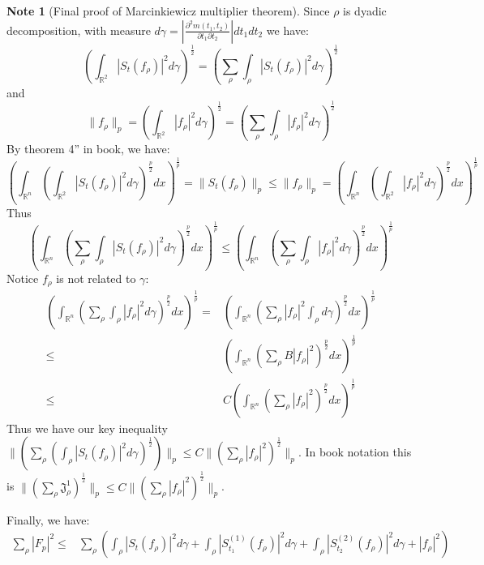 \documentclass{report}
\theoremstyle{definition}
\newtheorem{note}{Note}
\theoremstyle{definition}
\theoremstyle{plain}
\numberwithin{theorem}{section}
\numberwithin{remark}{section}
\numberwithin{equation}{section}
\newcommand{\norm}[1]{\lVert#1\rVert}
\newcommand{\abs}[1]{\left\lvert#1\right\rvert}
\begin{document}
\begin{note}[Final proof of Marcinkiewicz multiplier theorem]
    Since $\rho$ is dyadic decomposition, with measure $d\gamma=\abs{\frac{\partial^2 m(t_1,t_2)}{\partial t_1\partial t_2}}dt_1dt_2$ we have:
\begin{equation*}
    (\int_{\mathbb{R}^2}\abs{S_t(f_\rho)}^2d\gamma)^\frac{1}{2}=(\sum_\rho\int_{\rho}\abs{S_t(f_\rho)}^2d\gamma)^\frac{1}{2}
\end{equation*}
and
\begin{equation*}
    \norm{f_\rho}_p=(\int_{\mathbb{R}^2}\abs{f_\rho}^2d\gamma)^\frac{1}{2}=(\sum_\rho\int_{\rho}\abs{f_\rho}^2d\gamma)^\frac{1}{2}
\end{equation*}
By theorem 4'' in book, we have:
\begin{equation*}
    (\int_{\mathbb{R}^n}(\int_{\mathbb{R}^2}\abs{S_t(f_\rho)}^2d\gamma)^\frac{p}{2}dx)^\frac{1}{p}=\norm{S_t(f_\rho)}_p\leq\norm{f_\rho}_p=(\int_{\mathbb{R}^n}(\int_{\mathbb{R}^2}\abs{f_\rho}^2d\gamma)^\frac{p}{2}dx)^\frac{1}{p}
\end{equation*}
Thus 
\begin{equation*}
    (\int_{\mathbb{R}^n}(\sum_\rho\int_{\rho}\abs{S_t(f_\rho)}^2d\gamma)^\frac{p}{2}dx)^\frac{1}{p}\leq(\int_{\mathbb{R}^n}(\sum_\rho\int_{\rho}\abs{f_\rho}^2d\gamma)^\frac{p}{2}dx)^\frac{1}{p}
\end{equation*}
Notice $f_\rho$ is not related to $\gamma$:
\begin{align*}
    (\int_{\mathbb{R}^n}(\sum_\rho\int_{\rho}\abs{f_\rho}^2d\gamma)^\frac{p}{2}dx)^\frac{1}{p}=&(\int_{\mathbb{R}^n}(\sum_\rho\abs{f_\rho}^2\int_{\rho}d\gamma)^\frac{p}{2}dx)^\frac{1}{p}\\
    \leq& (\int_{\mathbb{R}^n}(\sum_\rho B\abs{f_\rho}^2)^\frac{p}{2}dx)^\frac{1}{p}\\
    \leq&C(\int_{\mathbb{R}^n}(\sum_\rho \abs{f_\rho}^2)^\frac{p}{2}dx)^\frac{1}{p}
\end{align*}
Thus we have our key inequality $\norm{(\sum_\rho(\int_{\rho}\abs{S_t(f_\rho)}^2d\gamma)^\frac{1}{2})}_p\leq C\norm{(\sum_\rho\abs{f_\rho}^2)^\frac{1}{2}}_p$. In book notation this is $\norm{(\sum_\rho\mathfrak{J}_\rho^1)^\frac{1}{2}}_p\leq C\norm{(\sum_\rho\abs{f_\rho}^2)^\frac{1}{2}}_p$.\par
Finally, we have:
\begin{align*}
    \sum_\rho\abs{F_p}^2\leq&\sum_\rho(\int_{\rho}\abs{S_t(f_\rho)}^2d\gamma+\int_{\rho}\abs{S_{t_1}^{(1)}(f_\rho)}^2d\gamma+\int_{\rho}\abs{S_{t_2}^{(2)}(f_\rho)}^2d\gamma+\abs{f_\rho}^2)\\

\end{align*}
\end{note}
\end{document}
